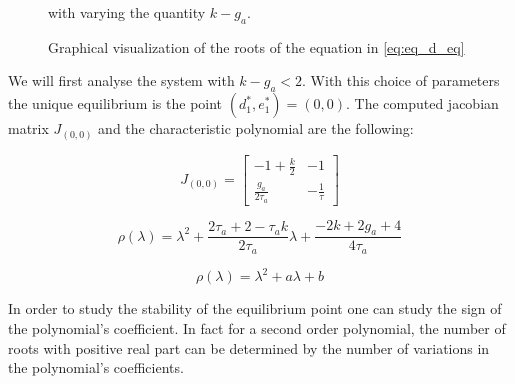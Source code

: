  \begin{figure}[!h]
        \caption{\label{fig:eq2D_adapt} Graphical visualization of the roots of the equation in \eqref{eq:eq_d_eq}} with varying the quantity $k - g_a$.
\end{figure}

We will first analyse the system with $k - g_a < 2$. With this choice of parameters the unique equilibrium is the point $(d_1^*,e_1^*)=(0, 0)$. The computed jacobian matrix $J_{(0,0)}$ and the characteristic polynomial are the following:

\begin{equation}
J_{(0, 0)} = \begin{bmatrix} 
-1 + \frac{k}{2} & -1 \\
\frac{g_a}{2\tau_a} & -\frac{1}{\tau}
\end{bmatrix}
\end{equation}

\begin{equation}
\rho(\lambda) = \lambda^2 +  \frac{2\tau_a + 2 - \tau_a k}{2\tau_a} \lambda + \frac{-2k + 2g_a + 4}{4\tau_a}
\end{equation}

\begin{equation}
\rho(\lambda) = \lambda^2 + a\lambda +b
\end{equation}

In order to study the stability of the equilibrium point one can study the sign of the polynomial's coefficient. In fact for a second order polynomial, the number of roots with positive real part can be determined by the number of variations in the polynomial's coefficients.

